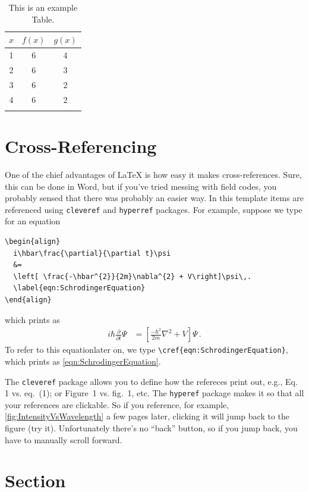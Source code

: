 \begin{table}
\caption{This is an example Table.}
  \begin{center}
  \begin{tabular}{ccc}
    $x$ & $f(x)$ & $g(x)$ \\
    \hline
    1 & 6 & 4  \\
    2 & 6 & 3  \\
    3 & 6 & 2  \\
    4 & 6 & 2  \\
    \label{tab:ValuesOfFunctions}
  \end{tabular}
  \end{center}
\end{table}

\section{Cross-Referencing}
One of the chief advantages of \LaTeX{} is how easy it makes cross-references.
Sure, this can be done in Word, but if you've tried messing with field codes, you probably sensed that there was probably an easier way.
In this template items are referenced using \texttt{cleveref} and \texttt{hyperref} packages.
For example, suppose we type for an equation
{\small
\begin{verbatim}
\begin{align}
  i\hbar\frac{\partial}{\partial t}\psi 
  &=
  \left[ \frac{-\hbar^{2}}{2m}\nabla^{2} + V\right]\psi\,.
  \label{eqn:SchrodingerEquation}
\end{align}
\end{verbatim}
}%
which prints as
\begin{align}
  i\hbar\frac{\partial}{\partial t}\Psi &= \left[ \frac{-\hbar^{2}}{2m}\nabla^{2} + V\right]\Psi\,.
  \label{eqn:SchrodingerEquation}
\end{align}
To refer to this equationlater on, we type \verb|\cref{eqn:SchrodingerEquation}|, which prints as \cref{eqn:SchrodingerEquation}.

The \texttt{cleveref} package allows you to define how the refereces print out, e.g., Eq. 1 vs. eq.~(1); or Figure~1 vs. fig.~1, etc.
The \texttt{hyperef} package makes it so that all your references are clickable. 
So if you reference, for example, \cref{fig:IntensityVsWavelength} a few pages later, clicking it will jump back to the figure (try it).
Unfortunately there's no ``back'' button, so if you jump back, you have to manually scroll forward.

\section{Section}

